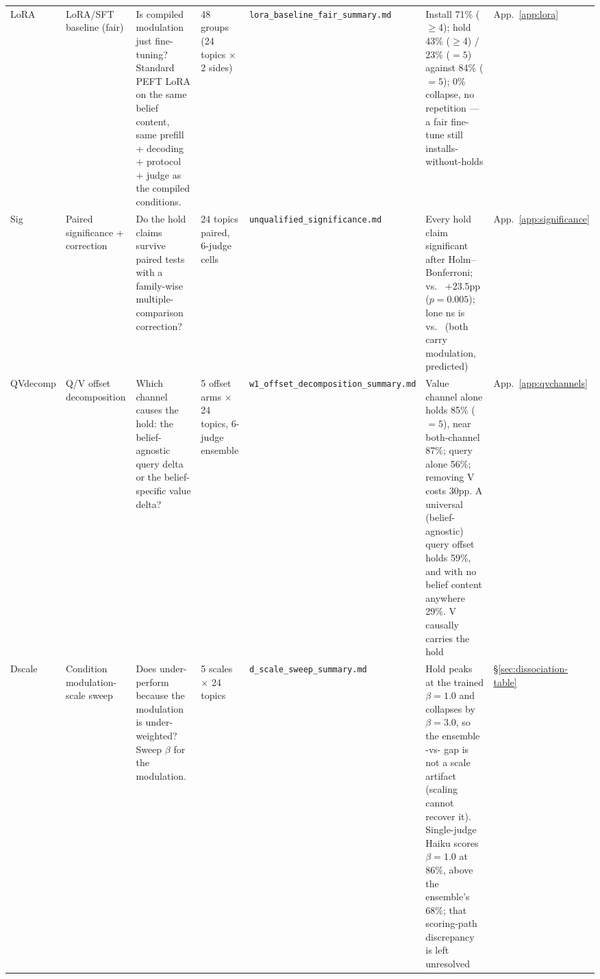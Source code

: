 \begin{longtable}{@{}p{}p{}p{}p{}p{}p{}p{}@{}}
\label{app:exp-lora}LoRA &
LoRA/SFT baseline (fair) &
Is compiled modulation just fine-tuning? Standard PEFT LoRA on the same belief content,
same prefill + decoding + protocol + judge as the compiled conditions. &
48 groups (24 topics \(\times\) 2 sides) &
\texttt{lora\_\allowbreak baseline\_\allowbreak fair\_\allowbreak summary.md} &
Install 71\% (\(\ge\)4); hold 43\% (\(\ge\)4) / 23\% (\(=5\)) against \condF{} 84\% (\(=5\));
0\% collapse, no repetition --- a fair fine-tune still installs-without-holds &
App.~\ref{app:lora} \\
\addlinespace

\label{app:exp-sig}Sig &
Paired significance + correction &
Do the hold claims survive paired tests with a family-wise multiple-comparison
correction? &
24 topics paired, 6-judge cells &
\texttt{unqualified\_\allowbreak significance.md} &
Every hold claim significant after Holm--Bonferroni; \condC{} vs.\ \condB{} \(+23.5\)pp
(\(p=0.005\)); lone ns is \condF{} vs.\ \condC{} (both carry modulation, predicted) &
App.~\ref{app:significance} \\
\addlinespace

\label{app:exp-qvdecomp}QVdecomp &
Q/V offset decomposition &
Which channel causes the hold: the belief-agnostic query delta or the belief-specific value
delta? &
5 offset arms \(\times\) 24 topics, 6-judge ensemble &
\texttt{w1\_offset\_\allowbreak decomposition\_\allowbreak summary.md} &
Value channel alone holds 85\% (\(=5\)), near both-channel 87\%; query alone 56\%; removing V
costs \(30\)pp. A universal (belief-agnostic) query offset holds 59\%, and with no belief
content anywhere 29\%. V causally carries the hold &
App.~\ref{app:qvchannels} \\
\addlinespace

\label{app:exp-dscale}Dscale &
Condition \condD{} modulation-scale sweep &
Does \condD{} under-perform because the modulation is under-weighted? Sweep \(\beta\) for the
\condD{} modulation. &
5 scales \(\times\) 24 topics &
\texttt{d\_scale\_\allowbreak sweep\_\allowbreak summary.md} &
Hold peaks at the trained \(\beta{=}1.0\) and collapses by \(\beta{=}3.0\), so the ensemble
\condD{}-vs-\condF{} gap is not a scale artifact (scaling cannot recover it). Single-judge Haiku
scores \(\beta{=}1.0\) at 86\%, above the ensemble's 68\%; that scoring-path discrepancy is left
unresolved &
\S\ref{sec:dissociation-table} \\

\end{longtable}
\endgroup

